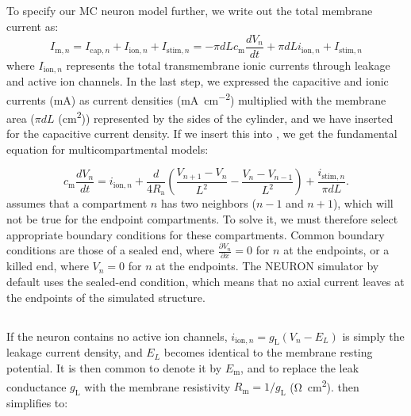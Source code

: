 \subsection{}
\label{sec:Neuron:Active_multicomp}
To specify our MC neuron model further, we write out the total membrane current as:
\begin{equation}
I_{\mathrm{m},n} = I_{\mathrm{cap},n} + I_{\mathrm{ion},n} + I_{\mathrm{stim},n} = -\pi d L c_\text{m} \frac{dV_n}{dt} + \pi d L i_{\mathrm{ion},n} + I_{\mathrm{stim},n}
\label{eq:Neuron:Imemb}
\end{equation}
where $I_{\mathrm{ion},n}$ represents the total transmembrane ionic currents through leakage and active ion channels. In the last step, we expressed the capacitive and ionic currents (\si{\milli\ampere}) as current densities (\si{\milli\ampere\per\square\centi\metre}) multiplied with the membrane area ($\pi d L$ (\si{\square\centi\metre})) represented by the sides of the cylinder, and we have inserted  for the capacitive current density. If we insert this into , we get the fundamental equation for multicompartmental models:

\begin{equation}
c_\text{m} \frac{dV_n}{dt} = i_{\mathrm{ion},n} + \frac{d}{4R_\text{a}}\left(\frac{V_{n+1}-V_n}{L^2} - \frac{V_n-V_{n-1}}{L^2} \right) + \frac{i_{\mathrm{stim},n}}{\pi d L}.
\label{eq:Neuron:multimain}
\end{equation}
 assumes that a compartment $n$ has two neighbors ($n-1$ and $n+1$), which will not be true for the endpoint compartments. To solve it, we must therefore select appropriate boundary conditions for these compartments. Common boundary conditions are those of a sealed end, where $\frac{\partial V_n}{\partial x} = 0$ for $n$ at the endpoints, or a killed end, where $V_n=0$ for $n$ at the endpoints. The NEURON simulator by default uses the sealed-end condition, which means that no axial current leaves at the endpoints of the simulated structure. 


\subsection{}
\label{sec:Neuron:Passive_multicomp}
If the neuron contains no active ion channels, $i_{\mathrm{ion},n} = g_\text{L}(V_n - E_L)$ is simply the leakage current density, and $E_L$ becomes identical to the membrane resting potential. It is then common to denote it by $E_\text{m}$, and to replace the leak conductance $g_\text{L}$ with the membrane resistivity $R_\text{m} = 1/g_\text{L}$ (\si{\ohm\square\centi\metre}).  then simplifies to:

